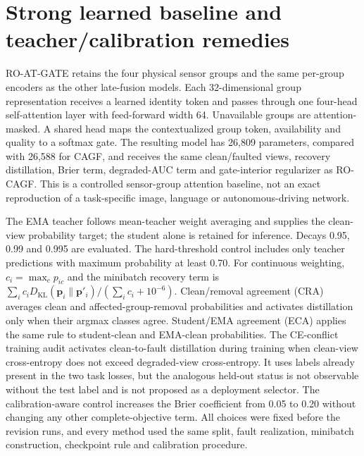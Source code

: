 \documentclass[10pt]{article}
\begin{document}
\section{Strong learned baseline and teacher/calibration remedies}

RO-AT-GATE retains the four physical sensor groups and the same per-group encoders as the other late-fusion models. Each 32-dimensional group representation receives a learned identity token and passes through one four-head self-attention layer with feed-forward width 64. Unavailable groups are attention-masked. A shared head maps the contextualized group token, availability and quality to a softmax gate. The resulting model has 26,809 parameters, compared with 26,588 for CAGF, and receives the same clean/faulted views, recovery distillation, Brier term, degraded-AUC term and gate-interior regularizer as RO-CAGF. This is a controlled sensor-group attention baseline, not an exact reproduction of a task-specific image, language or autonomous-driving network.

The EMA teacher follows mean-teacher weight averaging and supplies the clean-view probability target; the student alone is retained for inference. Decays 0.95, 0.99 and 0.995 are evaluated. The hard-threshold control includes only teacher predictions with maximum probability at least 0.70. For continuous weighting, $c_i=\max_c p_{ic}$ and the minibatch recovery term is $\sum_i c_iD_{\mathrm{KL}}(\mathbf p_i\|\mathbf p'_i)/(\sum_i c_i+10^{-6})$. Clean/removal agreement (CRA) averages clean and affected-group-removal probabilities and activates distillation only when their argmax classes agree. Student/EMA agreement (ECA) applies the same rule to student-clean and EMA-clean probabilities. The CE-conflict training audit activates clean-to-fault distillation during training when clean-view cross-entropy does not exceed degraded-view cross-entropy. It uses labels already present in the two task losses, but the analogous held-out status is not observable without the test label and is not proposed as a deployment selector. The calibration-aware control increases the Brier coefficient from 0.05 to 0.20 without changing any other complete-objective term. All choices were fixed before the revision runs, and every method used the same split, fault realization, minibatch construction, checkpoint rule and calibration procedure.

\begin{table}[H]
\centering
\caption{Strong-baseline, teacher and calibration controls under the unique chemical headline fault. Values are means across 10 matched optimization seeds after per-seed temperature scaling. These seeds are repeated fits, not devices.}
\label{tab:supp-strong-controls}
\resizebox{\textwidth}{!}{}
\end{table}
\end{document}
